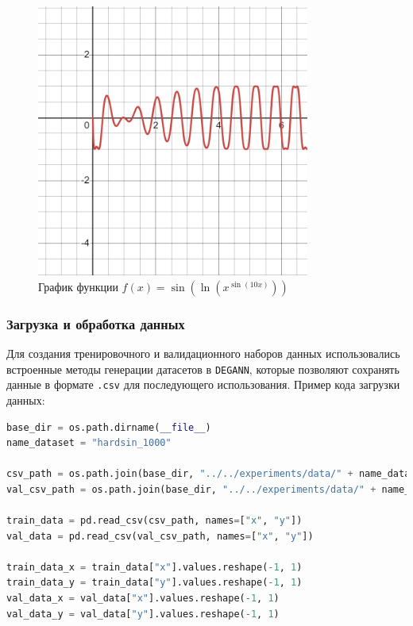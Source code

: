 \begin{figure}[H]
    \centering
    \includegraphics[width=0.8\textwidth]{figures/graph_hardsin.png}
    \caption{График функции $f(x) = \sin\left(\ln(x^{\sin(10x)})\right)$}
    \label{fig:hardsin_graph}
\end{figure}

\subsubsection{Загрузка и обработка данных}
Для создания тренировочного и валидационного наборов данных использовались встроенные методы генерации датасетов в \texttt{DEGANN}, которые позволяют сохранять данные в формате \texttt{.csv} для последующего использования. Пример кода загрузки данных:

\begin{lstlisting}[language=Python, breaklines, caption=Загрузка данных из CSV-файлов]
base_dir = os.path.dirname(__file__)
name_dataset = "hardsin_1000"

csv_path = os.path.join(base_dir, "../../experiments/data/" + name_dataset + "_train.csv")
val_csv_path = os.path.join(base_dir, "../../experiments/data/" + name_dataset + "_validate.csv")

train_data = pd.read_csv(csv_path, names=["x", "y"])
val_data = pd.read_csv(val_csv_path, names=["x", "y"])

train_data_x = train_data["x"].values.reshape(-1, 1)
train_data_y = train_data["y"].values.reshape(-1, 1)
val_data_x = val_data["x"].values.reshape(-1, 1)
val_data_y = val_data["y"].values.reshape(-1, 1)
\end{lstlisting}

